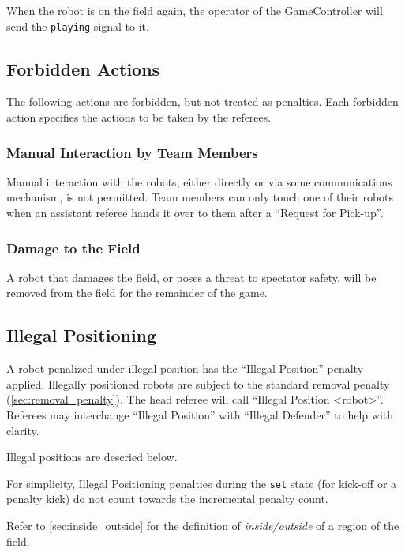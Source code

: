 When the robot is on the field again, the operator of the GameController will send the \texttt{playing} signal to it.


\subsection{Forbidden Actions}

The following actions are forbidden, but not treated as penalties.
Each forbidden action specifies the actions to be taken by the referees.

\subsubsection{Manual Interaction by Team Members}

Manual interaction with the robots, either directly or via some communications mechanism, is not permitted.
Team members can only touch one of their robots when an assistant referee hands it over to them after a ``Request for Pick-up''.

\subsubsection{Damage to the Field}
\label{sec:damage}

A robot that damages the field, or poses a threat to spectator safety, will be removed from the field for the remainder of the game.

\subsection{Illegal Positioning}
\label{sec:illegal_positioning}

A robot penalized under illegal position has the ``Illegal Position'' penalty applied. Illegally positioned robots are subject to the standard removal penalty (\cf \cref{sec:removal_penalty}).
The head referee will call ``Illegal Position  \textless robot\textgreater''.
Referees may interchange ``Illegal Position'' with ``Illegal Defender'' to help with clarity.

Illegal positions are descried below.

For simplicity, Illegal Positioning penalties during the \texttt{set} state (for kick-off or a penalty kick) do not count towards the incremental penalty count.

Refer to \cref{sec:inside_outside} for the definition of \textit{inside/outside} of a region of the field.

